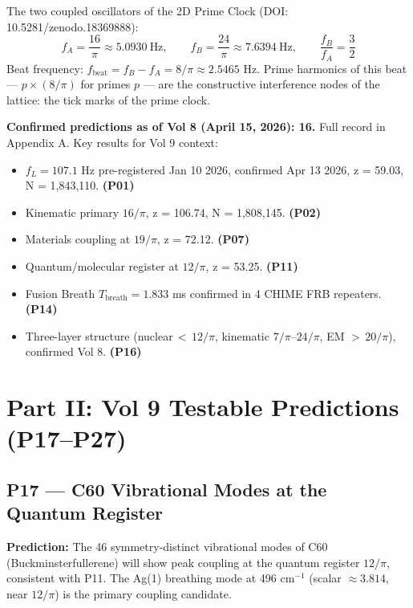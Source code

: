 \documentclass[12pt, letterpaper]{article}
\begin{document}
\medskip
The two coupled oscillators of the 2D Prime Clock
(DOI: 10.5281/zenodo.18369888):
\[
f_A = \frac{16}{\pi} \approx 5.0930\ \text{Hz}, \qquad
f_B = \frac{24}{\pi} \approx 7.6394\ \text{Hz}, \qquad
\frac{f_B}{f_A} = \frac{3}{2}
\]
Beat frequency: $f_\mathrm{beat} = f_B - f_A = 8/\pi \approx 2.5465$ Hz.
Prime harmonics of this beat --- $p \times (8/\pi)$ for primes $p$ --- are
the constructive interference nodes of the lattice: the tick marks of the
prime clock.

\begin{confirmedbox}
\textbf{Confirmed predictions as of Vol 8 (April 15, 2026): 16.}
Full record in Appendix A. Key results for Vol 9 context:

\begin{itemize}
\item $f_L = 107.1$ Hz pre-registered Jan 10 2026, confirmed Apr 13 2026,
  z = 59.03, N = 1,843,110. \textbf{(P01)}
\item Kinematic primary $16/\pi$, z = 106.74, N = 1,808,145. \textbf{(P02)}
\item Materials coupling at $19/\pi$, z = 72.12. \textbf{(P07)}
\item Quantum/molecular register at $12/\pi$, z = 53.25. \textbf{(P11)}
\item Fusion Breath $T_\mathrm{breath} = 1.833$ ms confirmed in 4 CHIME
  FRB repeaters. \textbf{(P14)}
\item Three-layer structure (nuclear$\,{<}\,12/\pi$, kinematic
  $7/\pi$--$24/\pi$, EM $>\,20/\pi$), confirmed Vol 8. \textbf{(P16)}
\end{itemize}
\end{confirmedbox}

\newpage

\section*{Part II: Vol 9 Testable Predictions (P17--P27)}

\subsection*{P17 --- C60 Vibrational Modes at the Quantum Register}

\textbf{Prediction:} The 46 symmetry-distinct vibrational modes of C60
(Buckminsterfullerene) will show peak coupling at the quantum register
$12/\pi$, consistent with P11. The Ag(1) breathing mode at 496 cm$^{-1}$
(scalar $\approx 3.814$, near $12/\pi$) is the primary coupling candidate.
\end{document}
